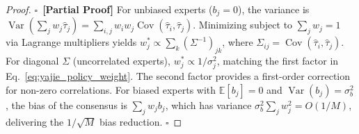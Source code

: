 \documentclass[11pt,a4paper]{article}
\theoremstyle{definition}
\newcommand{\rigorPartial}[0]{$\square$~\textbf{[Partial Proof]}}
\DeclareMathOperator{\Var}{Var}
\DeclareMathOperator{\Cov}{Cov}
\newcommand{\E}{\mathbb{E}}
\begin{document}
\begin{proof}\rigorPartial
For unbiased experts ($b_j = 0$), the variance is $\Var(\sum_j w_j \hat{\tau}_j) = \sum_{i,j} w_i w_j \Cov(\hat{\tau}_i, \hat{\tau}_j)$. Minimizing subject to $\sum_j w_j = 1$ via Lagrange multipliers yields $w_j^* \propto \sum_k (\Sigma^{-1})_{jk}$, where $\Sigma_{ij} = \Cov(\hat{\tau}_i, \hat{\tau}_j)$. For diagonal $\Sigma$ (uncorrelated experts), $w_j^* \propto 1/\sigma_j^2$, matching the first factor in Eq.~\eqref{eq:yajie_policy_weight}. The second factor provides a first-order correction for non-zero correlations. For biased experts with $\E[b_j] = 0$ and $\Var(b_j) = \sigma_b^2$, the bias of the consensus is $\sum_j w_j b_j$, which has variance $\sigma_b^2 \sum_j w_j^2 = O(1/M)$, delivering the $1/\sqrt{M}$ bias reduction. \hfill $\square$
\end{proof}
\end{document}
